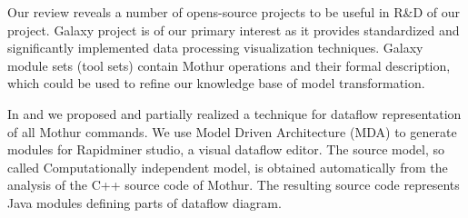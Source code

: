 \documentclass[a4paper]{jpconf}
\begin{document}
Our review reveals a number of opens-source projects to be useful in R\&D of our project.  Galaxy project is of our primary interest as it provides standardized and significantly implemented data processing visualization techniques.  Galaxy module sets (tool sets) contain Mothur operations and their formal description, which could be used to refine our knowledge base of model transformation.

In \cite{cherk19} and \cite{zont19} we proposed and partially realized a technique for dataflow representation of all Mothur commands.  We use Model Driven Architecture (MDA) to generate modules for Rapidminer studio, a visual dataflow editor.  %
The source model, so called Computationally independent model, is obtained  automatically from the analysis of the C++ source code of Mothur.  The resulting source code represents Java modules defining parts of dataflow diagram.


\end{document}
